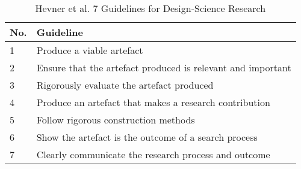 \begin{table}[ht]
  \begin{center}
    \caption{Hevner et al. 7 Guidelines for Design-Science Research}
    \label{tab:HevnerGuidelines}
    \begin{tabular}{l|l} %
      \textbf{No.} & \textbf{Guideline}\\
      \hline
      1 & Produce a viable artefact\\
      \hline
      2 & Ensure that the artefact produced is relevant and important\\
      \hline
      3 & Rigorously evaluate the artefact produced\\
      \hline
      4 & Produce an artefact that makes a research contribution\\
      \hline
      5 & Follow rigorous construction methods\\
      \hline
      6 & Show the artefact is the outcome of a search process\\
      \hline
      7 & Clearly communicate the research process and outcome\\
      \hline
    \end{tabular}
  \end{center}
\end{table}







